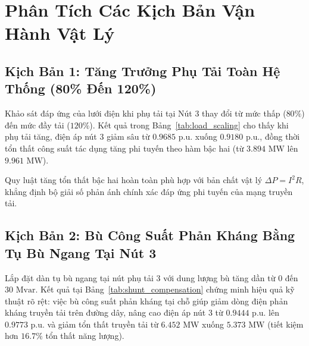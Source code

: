 \documentclass[12pt,a4paper,oneside]{report}
\begin{document}
\section{Phân Tích Các Kịch Bản Vận Hành Vật Lý}

\subsection{Kịch Bản 1: Tăng Trưởng Phụ Tải Toàn Hệ Thống (80\% Đến 120\%)}
Khảo sát đáp ứng của lưới điện khi phụ tải tại Nút 3 thay đổi từ mức thấp ($80\%$) đến mức đầy tải ($120\%$). Kết quả trong Bảng~\ref{tab:load_scaling} cho thấy khi phụ tải tăng, điện áp nút 3 giảm sâu từ $0.9685\text{ p.u.}$ xuống $0.9180\text{ p.u.}$, đồng thời tổn thất công suất tác dụng tăng phi tuyến theo hàm bậc hai (từ $3.894\text{ MW}$ lên $9.961\text{ MW}$).

\begin{table}[H]
\centering
\caption{Đáp ứng trào lưu công suất khi phụ tải hệ thống thay đổi.}
\label{tab:load_scaling}
\end{table}

Quy luật tăng tổn thất bậc hai hoàn toàn phù hợp với bản chất vật lý $\Delta P = I^2 R$, khẳng định bộ giải số phản ánh chính xác đáp ứng phi tuyến của mạng truyền tải.

\subsection{Kịch Bản 2: Bù Công Suất Phản Kháng Bằng Tụ Bù Ngang Tại Nút 3}
Lắp đặt dàn tụ bù ngang tại nút phụ tải 3 với dung lượng bù tăng dần từ $0$ đến $30\text{ Mvar}$. Kết quả tại Bảng~\ref{tab:shunt_compensation} chứng minh hiệu quả kỹ thuật rõ rệt: việc bù công suất phản kháng tại chỗ giúp giảm dòng điện phản kháng truyền tải trên đường dây, nâng cao điện áp nút 3 từ $0.9444\text{ p.u.}$ lên $0.9773\text{ p.u.}$ và giảm tổn thất truyền tải từ $6.452\text{ MW}$ xuống $5.373\text{ MW}$ (tiết kiệm hơn $16.7\%$ tổn thất năng lượng).
\end{document}
